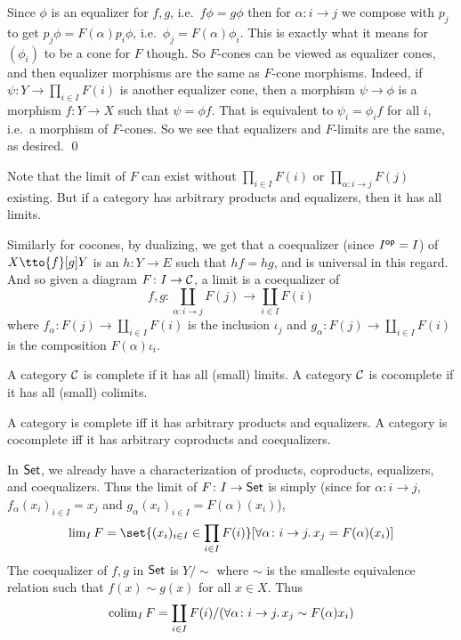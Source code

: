 \bproof

    Since $\phi$ is an equalizer for $f,g$, i.e.\ $f\phi=g\phi$ then for $\alpha\colon i\to j$ we compose with $p_j$ to get $p_j\phi=F(\alpha)p_i\phi$, i.e.\ $\phi_j=F(\alpha)\phi_i$.
    This is exactly what it means for $(\phi_i)$ to be a cone for $F$ though.
    So $F$-cones can be viewed as equalizer cones, and then equalizer morphisms are the same as $F$-cone morphisms.
    Indeed, if $\psi\colon Y\to\prod_{i\in I}F(i)$ is another equalizer cone, then a morphism $\psi\to\phi$ is a morphism $f\colon Y\to X$ such that $\psi=\phi f$.
    That is equivalent to $\psi_i=\phi_if$ for all $i$, i.e.\ a morphism of $F$-cones.
    So we see that equalizers and $F$-limits are the same, as desired.
    \qed

\eproof

Note that the limit of $F$ can exist without $\prod_{i\in I}F(i)$ or $\prod_{\alpha\colon i\to j}F(j)$ existing.
But if a category has arbitrary products and equalizers, then it has all limits.

Similarly for cocones, by dualizing, we get that a coequalizer (since $I^{\sf op}=I$) of $X\tto{f}[g]Y$ is an $h\colon Y\to E$ such that $hf=hg$, and is universal in this regard.
And so given a diagram $F\colon I\to{{\cal C}}$, a limit is a coequalizer of
$$ f,g\colon\coprod_{\alpha\colon i\to j}F(j)\to\coprod_{i\in I}F(i) $$
where $f_\alpha\colon F(j)\to\coprod_{i\in I}F(i)$ is the inclusion $\iota_j$ and $g_\alpha\colon F(j)\to\coprod_{i\in I}F(i)$ is the composition $F(\alpha)\iota_i$.

\bdefn

    A category ${{\cal C}}$ is {\emphcolor complete} if it has all (small) limits.
    A category ${{\cal C}}$ is {\emphcolor cocomplete} if it has all (small) colimits.

\edefn

\bcoro

    A category is complete iff it has arbitrary products and equalizers.
    A category is cocomplete iff it has arbitrary coproducts and coequalizers.

\ecoro

\bexam

    In ${\sf Set}$, we already have a characterization of products, coproducts, equalizers, and coequalizers.
    Thus the limit of $F\colon I\to{\sf Set}$ is simply (since for $\alpha\colon i\to j$, $f_\alpha(x_i)_{i\in I}=x_j$ and $g_\alpha(x_i)_{i\in I}=F(\alpha)(x_i)$),
    $$ \lim_IF = \set{(x_i)_{i\in I}\in\prod_{i\in I}F(i)}[\forall\alpha\colon i\to j.\,x_j=F(\alpha)(x_i)] $$
    The coequalizer of $f,g$ in ${\sf Set}$ is $Y/{\sim}$ where $\sim$ is the smalleste equivalence relation such that $f(x)\sim g(x)$ for all $x\in X$.
    Thus
    $$ \mathop{\rm colim}\nolimits_IF = \coprod_{i\in I}F(i)/(\forall\alpha\colon i\to j.\,x_j\sim F(\alpha)x_i) $$

